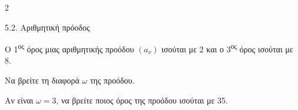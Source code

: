 \begin{ylh}{2}
    \item 5.2. Αριθμητική πρόοδος
\end{ylh}
Ο 1\textsuperscript{ος} όρος μιας αριθμητικής προόδου $(a_\nu)$ ισούται με 2 και ο 3\textsuperscript{ος} όρος ισούται με 8. 
\begin{alist}
\item Να βρείτε τη διαφορά $\omega$ της προόδου.

\item Αν είναι $\omega = 3$, να βρείτε ποιος όρος της προόδου ισούται με 35.

\end{alist}

